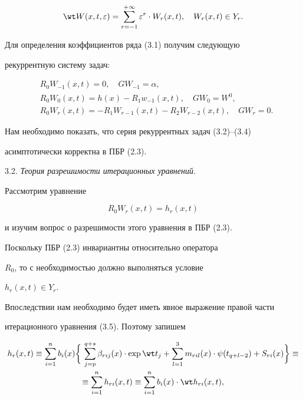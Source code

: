 \begin{equation} 


\wt W(x,t,\varepsilon)=\sum^{+\infty}_{r=-1} 


\varepsilon^r\cdot W_r(x,t),\quad W_r(x,t)\in Y_r. 


\end{equation} 


Для определения коэффициентов ряда (3.1) получим следующую 


рекуррентную систему задач: 


\begin{align} 


&R_0W_{-1}(x,t)=0,\quad G W_{-1}=\alpha,\\ 


&R_0W_0(x,t)=h(x)-R_1w_{-1}(x,t),\quad G W_0=W^0,\\ 


&R_0W_r(x,t)=-R_1W_{r-1}(x,t)- 


R_2W_{r-2}(x,t),\quad G W_r=0. 


\end{align} 


Нам необходимо показать, что серия рекуррентных задач (3.2)--(3.4) 


асимптотически корректна в ПБР (2.3). 


 


3.2. {\it Теория разрешимости итерационных уравнений}. 


Рассмотрим уравнение 


\begin{equation} 


R_0 W_r(x,t)=h_r(x,t) 


\end{equation} 


и изучим вопрос о разрешимости этого уравнения в ПБР (2.3). 


Поскольку ПБР (2.3) инвариантны относительно оператора 


$R_0$, то с необходимостью должно выполняться условие 


$h_r(x,t)\in Y_r$. 


Впоследствии нам необходимо будет иметь явное выражение правой части 


итерационного уравнения (3.5). Поэтому запишем 


\begin{multline} 


h_r(x,t)\equiv\sum^n_{i=1}b_i(x)\bigg\{\, 


\sum^{q+s}_{j=p}\beta_{rij}(x)\cdot\exp\wt t_j+\sum^3_{l=1} 


m_{ril}(x)\cdot\psi(t_{q+l-2})+S_{ri}(x)\bigg\}\equiv \\ 


\equiv\sum^n_{i=1}h_{ri}(x,t)\equiv\sum^n_{i=1}b_i(x) \cdot


\wt h_{ri}(x,t), 


\end{multline} 


